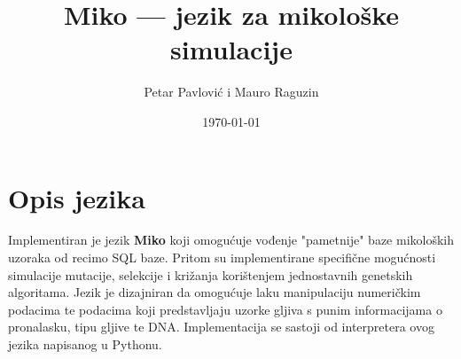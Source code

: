 \documentclass[12pt]{scrartcl}
\title{Miko --- jezik za mikološke simulacije}
\author{Petar Pavlović i Mauro Raguzin}
\date{\today}
\begin{document}
\maketitle
\tableofcontents
\pagebreak

\section{Opis jezika}
Implementiran je jezik \textbf{Miko} koji omogućuje vođenje "pametnije" baze mikoloških uzoraka od recimo SQL baze. Pritom su implementirane specifične
mogućnosti simulacije mutacije, selekcije i križanja korištenjem jednostavnih genetskih algoritama. Jezik je dizajniran da omogućuje laku manipulaciju
numeričkim podacima te podacima koji predstavljaju uzorke gljiva s punim informacijama o pronalasku, tipu gljive te DNA. Implementacija se sastoji
od interpretera ovog jezika napisanog u Pythonu.
\end{document}
